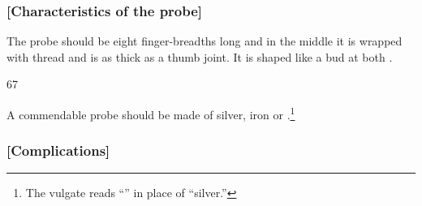 \subsubsection{[Characteristics of the probe]}

\begin{translation}
    
    \item[\empty ] 
    The probe should be eight finger-breadths long and in the middle it is wrapped with thread 
    and is as thick as a thumb joint.  It is shaped like a bud at both .
    
    \item[67]
    
    A commendable probe should be made of silver, iron or 
    .\footnote{The vulgate reads “” in place of 
    “silver.”}
    
    
\end{translation}

\subsubsection{[Complications]}

